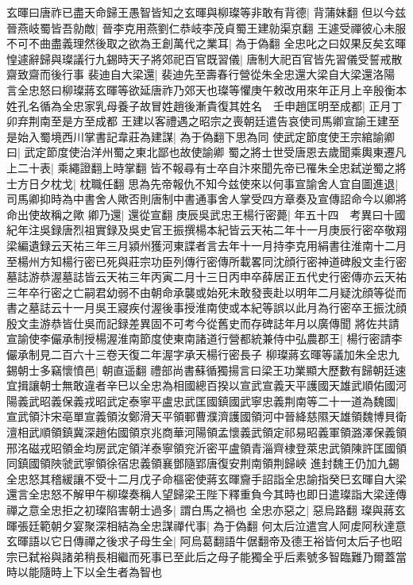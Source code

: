玄暉曰唐祚已盡天命歸王愚智皆知之玄暉與柳璨等非敢有背德|{
	背蒲妹翻}
但以今兹晉燕岐蜀皆吾勍敵|{
	晉李克用燕劉仁恭岐李茂貞蜀王建勍渠京翻}
王遽受禪彼心未服不可不曲盡義理然後取之欲為王創萬代之業耳|{
	為于偽翻}
全忠叱之曰奴果反矣玄暉惶遽辭歸與璨議行九錫時天子將郊祀百官既習儀|{
	唐制大祀百官皆先習儀受誓戒散齋致齋而後行事}
裴迪自大梁還|{
	裴迪先至壽春行營從朱全忠還大梁自大梁還洛陽}
言全忠怒曰柳璨蔣玄暉等欲延唐祚乃郊天也璨等懼庚午敕改用來年正月上辛殷衡本姓孔名循為全忠家乳母養子故冒姓趙後漸貴復其姓名　壬申趙匡明至成都|{
	正月丁卯弃荆南至是方至成都}
王建以客禮遇之昭宗之喪朝廷遣告哀使司馬卿宣諭王建至是始入蜀境西川掌書記韋莊為建謀|{
	為于偽翻下思為同}
使武定節度使王宗綰諭卿曰|{
	武定節度使治洋州蜀之東北鄙也故使諭卿}
蜀之將士世受唐恩去歲聞乘輿東遷凡上二十表|{
	乘繩證翻上時掌翻}
皆不報尋有士卒自汴來聞先帝已罹朱全忠弑逆蜀之將士方日夕枕戈|{
	枕職任翻}
思為先帝報仇不知今兹使來以何事宣諭舍人宜自圖進退|{
	司馬卿抑時為中書舍人歟否則唐制中書通事舍人掌受四方章奏及宣傳詔命今以卿將命出使故稱之歟}
卿乃還|{
	還從宣翻}
庚辰吳武忠王楊行密薨|{
	年五十四　考異曰十國紀年注吳録唐烈祖實録及吳史官王振撰楊本紀皆云天祐二年十一月庚辰行密卒敬翔梁編遺録云天祐三年三月潁州獲河東諜者言去年十一月持李克用絹書往淮南十二月至楊州方知楊行密已死與莊宗功臣列傳行密傳所載畧同沈顔行密神道碑殷文圭行密墓誌游恭渥墓誌皆云天祐三年丙寅二月十三日丙申卒薛居正五代史行密傳亦云天祐三年卒行密之亡嗣君幼弱不由朝命承襲或始死未敢發喪赴以明年二月疑沈顔等從而書之墓誌云十一月吳王寢疾付渥後事授淮南使或本紀等誤以此月為行密卒王振沈顔殷文圭游恭皆仕吳而記録差異固不可考今從舊史而存碑誌年月以廣傳聞}
將佐共請宣諭使李儼承制授楊渥淮南節度使東南諸道行營都統兼侍中弘農郡王|{
	楊行密請李儼承制見二百六十三卷天復二年渥字承天楊行密長子}
柳璨蔣玄暉等議加朱全忠九錫朝士多竊懷憤邑|{
	朝直遥翻}
禮部尚書蘇循獨揚言曰梁王功業顯大歷數有歸朝廷速宜揖讓朝士無敢違者辛巳以全忠為相國總百揆以宣武宣義天平護國天雄武順佑國河陽義武昭義保義戎昭武定泰寧平盧忠武匡國鎮國武寧忠義荆南等二十一道為魏國|{
	宣武領汴宋亳單宣義領汝鄭滑天平領鄆曹濮濟護國領河中晉絳慈隰天雄領魏博貝衛澶相武順領鎮冀深趙佑國領京兆商華河陽領孟懷義武領定祁易昭義軍領潞澤保義領邢洺磁戎昭領金均房武定領洋泰寧領兖沂密平盧領青淄齊棣登萊忠武領陳許匡國領同鎮國領陜虢武寧領徐宿忠義領襄鄧隨郢唐復安荆南領荆歸峽}
進封魏王仍加九錫全忠怒其稽緩讓不受十二月戊子命樞密使蔣玄暉齎手詔詣全忠諭指癸巳玄暉自大梁還言全忠怒不解甲午柳璨奏稱人望歸梁王陛下釋重負今其時也即日遣璨詣大梁逹傳禪之意全忠拒之初璨陷害朝士過多|{
	謂白馬之禍也}
全忠亦惡之|{
	惡烏路翻}
璨與蔣玄暉張廷範朝夕宴聚深相結為全忠謀禪代事|{
	為于偽翻}
何太后泣遣宫人阿䖍阿秋達意玄暉語以它日傳禪之後求子母生全|{
	阿烏葛翻語牛倨翻帝及德王裕皆何太后子也昭宗已弑裕與諸弟稍長相繼而死事已至此后之母子能獨全乎后素號多智臨難乃爾蓋當時以能隨時上下以全生者為智也}
